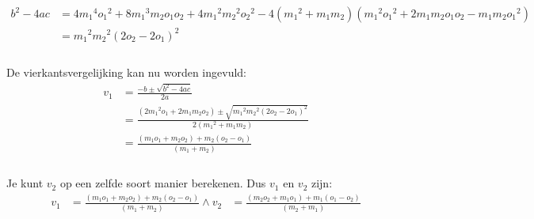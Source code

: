 \documentclass[12pt,a4paper]{article}
\begin{document}
	\begin{equation}
		\begin{aligned}
		b^2-4ac&=4{m_1}^4{o_1}^2+8{m_1}^3m_2o_1o_2+4{m_1}^2{m_2}^2{o_2}^2-4\left({m_1}^2+m_1m_2\right)\left({m_1}^2{o_1}^2+2m_1m_2o_1o_2-m_1m_2{o_1}^2\right)\\
			&={m_1}^2{m_2}^2{\left(2o_2-2o_1\right)}^2\\
		\end{aligned}
	\end{equation}
	\\De vierkantsvergelijking kan nu worden ingevuld:
	\begin{equation}
		\begin{aligned}
			v_1&=\frac{-b\pm\sqrt{b^2-4ac}}{2a}\\
			&=\frac{\left(2{m_1}^2o_1+2m_1m_2o_2\right)\pm\sqrt{{m_1}^2{m_2}^2{\left(2o_2-2o_1\right)}^2}}{2\left({m_1}^2+m_1m_2\right)}\\
			&=\frac{\left(m_1o_1+m_2o_2\right)+m_2\left(o_2-o_1\right)}{\left(m_1+m_2\right)}\\
		\end{aligned}
	\end{equation}
	\\Je kunt $v_2$ op een zelfde soort manier berekenen. Dus $v_1$ en $v_2$ zijn:
	\begin{equation}
		\begin{aligned}
		\label{uitwerking-energie-impuls}
			v_1&=\frac{\left(m_1o_1+m_2o_2\right)+m_2\left(o_2-o_1\right)}{\left(m_1+m_2\right)} \wedge v_2&=\frac{\left(m_2o_2+m_1o_1\right)+m_1\left(o_1-o_2\right)}{\left(m_2+m_1\right)}\\
		\end{aligned}
	\end{equation}
\end{document}
